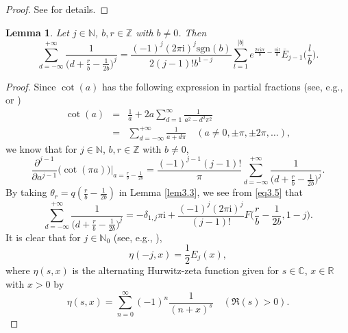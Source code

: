 \documentclass[reqno]{amsart}
\numberwithin{equation}{section}
\newtheorem{lemma}[thm]{Lemma}
\begin{document}
\begin{proof}
See \cite[Equation (2.28)]{he1} for details.
\end{proof}

\begin{lemma}\label{lem3.4} Let $j\in\mathbb{N}$, $b,r\in\mathbb{Z}$ with $b\not=0$. Then
\begin{equation}\label{eq3.4}
\sum_{d=-\infty}^{+\infty}\frac{1}{\bigl(d+\frac{r}{b}-\frac{1}{2b}\bigl)^{j}}
=\frac{(-1)^{j}(2\pi\mathrm{i})^{j}\mathrm{sgn}(b)}{2(j-1)!b^{1-j}}\sum_{l=1}^{|b|}e^{\frac{2\pi \mathrm{i}lr}{b}-\frac{\pi \mathrm{i}l}{b}}\overline{E}_{j-1}\biggl(\frac{l}{b}\biggl).
\end{equation}
\end{lemma}

\begin{proof}
Since $\cot(a)$ has the following expression in partial fractions (see, e.g., \cite[p. 75]{abramowitz} or \cite[p. 327]{remmert})
\begin{eqnarray*}
\cot(a)&=&\frac{1}{a}+2a\sum_{d=1}^{\infty}\frac{1}{a^{2}-d^{2}\pi^{2}}\\
&=&\sum_{d=-\infty}^{+\infty}\frac{1}{a+d\pi}\quad(a\not=0,\pm \pi,\pm 2\pi,\ldots),
\end{eqnarray*}
we know that for $j\in\mathbb{N}$, $b,r\in\mathbb{Z}$ with $b\not=0$,
\begin{equation}\label{eq3.5}
\frac{\partial^{j-1}}{\partial a^{j-1}}\bigl(\cot(\pi a)\bigl)\biggl|_{a=\frac{r}{b}-\frac{1}{2b}}=\frac{(-1)^{j-1}(j-1)!}{\pi}\sum_{d=-\infty}^{+\infty}\frac{1}{\bigl(d+\frac{r}{b}-\frac{1}{2b}\bigl)^{j}}.
\end{equation}
By taking $\theta_{r}=q(\frac{r}{b}-\frac{1}{2b})$ in Lemma \ref{lem3.3}, we see from \eqref{eq3.5} that
\begin{equation}\label{eq3.6}
\sum_{d=-\infty}^{+\infty}\frac{1}{\bigl(d+\frac{r}{b}-\frac{1}{2b}\bigl)^{j}}=-\delta_{1,j}\pi\mathrm{i}+\frac{(-1)^{j}(2\pi\mathrm{i})^{j}}{(j-1)!}
F\biggl(\frac{r}{b}-\frac{1}{2b},1-j\biggl).
\end{equation}
It is clear that for $j\in\mathbb{N}_{0}$ (see, e.g., \cite[Equation (2.32)]{he3}),
\begin{equation}\label{eq3.7}
\eta(-j,x)=\frac{1}{2}E_{j}(x),
\end{equation}
where $\eta(s,x)$ is the alternating Hurwitz-zeta function given for $s\in\mathbb{C}$, $x\in\mathbb{R}$ with $x>0$ by
\begin{equation*}
\eta(s,x)=\sum_{n=0}^{\infty}(-1)^{n}\frac{1}{(n+x)^{s}}\quad(\Re(s)>0).

\end{equation*}
\end{proof}
\end{document}
